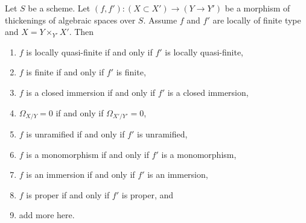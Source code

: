 \begin{lemma}
\label{lemma-properties-that-extend-over-thickenings}
Let $S$ be a scheme. Let $(f, f') : (X \subset X') \to (Y \to Y')$ be a
morphism of thickenings of algebraic spaces over $S$. Assume $f$ and $f'$
are locally of finite type and $X = Y \times_{Y'} X'$. Then
\begin{enumerate}
\item $f$ is locally quasi-finite if and only if $f'$ is locally quasi-finite,
\item $f$ is finite if and only if $f'$ is finite,
\item $f$ is a closed immersion if and only if $f'$ is a closed immersion,
\item $\Omega_{X/Y} = 0$ if and only if $\Omega_{X'/Y'} = 0$,
\item $f$ is unramified if and only if $f'$ is unramified,
\item $f$ is a monomorphism if and only if $f'$ is a monomorphism,
\item $f$ is an immersion if and only if $f'$ is an immersion,
\item $f$ is proper if and only if $f'$ is proper, and
\item add more here.
\end{enumerate}
\end{lemma}

